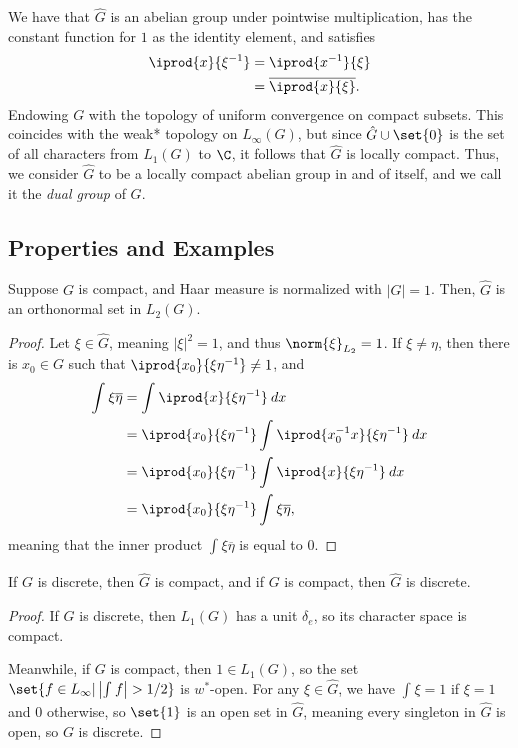 \documentclass[10pt]{mypackage}
\begin{document}
We have that $\hat{G}$ is an abelian group under pointwise multiplication, has the constant function for $1$ as the identity element, and satisfies
\begin{align*}
  \iprod{x}{\xi^{-1}} &= \iprod{x^{-1}}{\xi}\\
                      &= \overline{ \iprod{x}{\xi} }.
\end{align*}
Endowing $G$ with the topology of uniform convergence on compact subsets. This coincides with the weak* topology on $L_{\infty}(G)$, but since $\hat{G}\cup \set{0}$ is the set of all characters from $L_1(G)$ to $\C$, it follows that $\hat{G}$ is locally compact. Thus, we consider $\hat{G}$ to be a locally compact abelian group in and of itself, and we call it the \textit{dual group} of $G$.
\subsection{Properties and Examples}%
\begin{proposition}
  Suppose $G$ is compact, and Haar measure is normalized with $\left\vert G \right\vert = 1$. Then, $\hat{G}$ is an orthonormal set in $L_2(G)$.
\end{proposition}
\begin{proof}
  Let $\xi\in \hat{G}$, meaning $\left\vert \xi \right\vert^2 = 1$, and thus $\norm{\xi}_{L_2} = 1$. If $\xi\neq\eta$, then there is $x_0\in G$ such that $ \iprod{x_0}{\xi\eta^{-1}}\neq 1 $, and
  \begin{align*}
    \int_{}^{} \xi \overline{\eta} &= \int_{}^{} \iprod{x}{\xi\eta^{-1}}\:dx\\
                                   &= \iprod{x_0}{\xi\eta^{-1}} \int_{}^{} \iprod{x_0^{-1}x}{\xi\eta^{-1}}\:dx\\
                                   &= \iprod{x_0}{\xi\eta^{-1}} \int_{}^{} \iprod{x}{\xi\eta^{-1}}\:dx\\
                                   &= \iprod{x_0}{\xi\eta^{-1}} \int_{}^{}\xi \overline{\eta},
  \end{align*}
  meaning that the inner product $ \int_{}^{} \xi \overline{\eta} $ is equal to $0$.
\end{proof}
\begin{proposition}
  If $G$ is discrete, then $\hat{G}$ is compact, and if $G$ is compact, then $\hat{G}$ is discrete.
\end{proposition}
\begin{proof}
  If $G$ is discrete, then $L_1(G)$ has a unit $\delta_e$, so its character space is compact.

  Meanwhile, if $G$ is compact, then $1\in L_1(G)$, so the set $\set{f\in L_{\infty} | \left\vert \int_{}^{} f \right\vert > 1/2}$ is $w^{\ast}$-open. For any $\xi\in\hat{G}$, we have $ \int_{}^{} \xi = 1 $ if $\xi = 1$ and $0$ otherwise, so $\set{1}$ is an open set in $\hat{G}$, meaning every singleton in $\hat{G}$ is open, so $G$ is discrete.
\end{proof}
\end{document}
